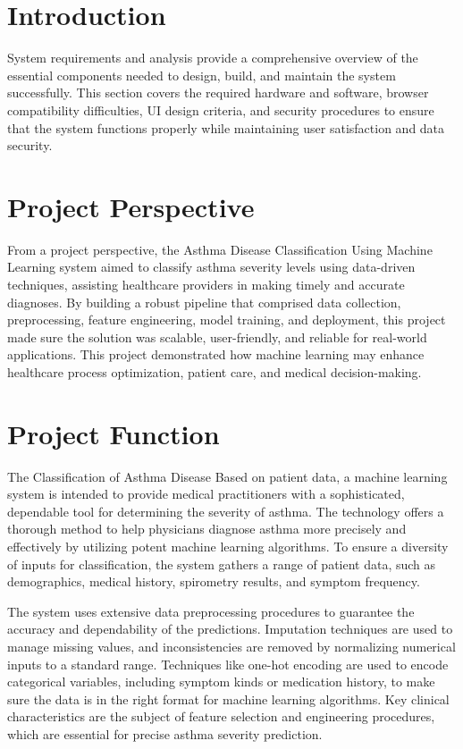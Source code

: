 \section{Introduction}
System requirements and analysis provide a comprehensive overview of the essential components needed to design, build, and maintain the system successfully. This section covers the required hardware and software, browser compatibility difficulties, UI design criteria, and security procedures to ensure that the system functions properly while maintaining user satisfaction and data security.

\section{Project Perspective}
From a project perspective, the Asthma Disease Classification Using Machine Learning system aimed to classify asthma severity levels using data-driven techniques, assisting healthcare providers in making timely and accurate diagnoses. By building a robust pipeline that comprised data collection, preprocessing, feature engineering, model training, and deployment, this project made sure the solution was scalable, user-friendly, and reliable for real-world applications. This project demonstrated how machine learning may enhance healthcare process optimization, patient care, and medical decision-making.

\section{Project Function}
The Classification of Asthma Disease Based on patient data, a machine learning system is intended to provide medical practitioners with a sophisticated, dependable tool for determining the severity of asthma. The technology offers a thorough method to help physicians diagnose asthma more precisely and effectively by utilizing potent machine learning algorithms. To ensure a diversity of inputs for classification, the system gathers a range of patient data, such as demographics, medical history, spirometry results, and symptom frequency.


The system uses extensive data preprocessing procedures to guarantee the accuracy and dependability of the predictions. Imputation techniques are used to manage missing values, and inconsistencies are removed by normalizing numerical inputs to a standard range. Techniques like one-hot encoding are used to encode categorical variables, including symptom kinds or medication history, to make sure the data is in the right format for machine learning algorithms. Key clinical characteristics are the subject of feature selection and engineering procedures, which are essential for precise asthma severity prediction.

